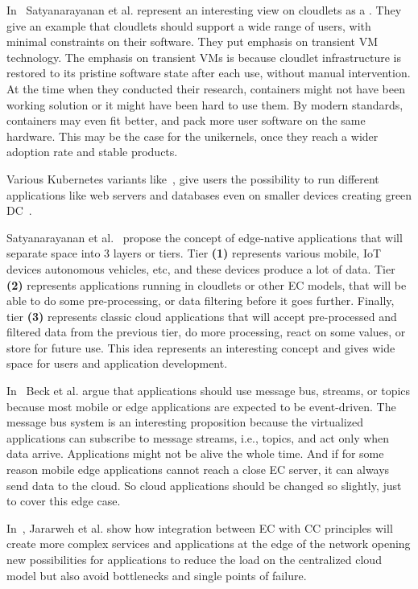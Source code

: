 In~\cite{SatyanarayananBCD09} Satyanarayanan et al. represent an interesting view on cloudlets as a . They give an example that cloudlets should support a wide range of users, with minimal constraints on their software. They put emphasis on transient VM technology. The emphasis on transient VMs is because cloudlet infrastructure is restored to its pristine software state after each use, without manual intervention. At the time when they conducted their research, containers might not have been working solution or it might have been hard to use them. By modern standards, containers may even fit better, and pack more user software on the same hardware. This may be the case for the unikernels, once they reach a wider adoption rate and stable products.

Various Kubernetes variants like~\cite{KubeEdge, RossiCPN20}, give users the possibility to run different applications like web servers and databases even on smaller devices creating green DC~\cite{ArocaG12}.

Satyanarayanan et al.~\cite{SatyanarayananK19} propose the concept of edge-native applications that will separate space into 3 layers or tiers. Tier \textbf{(1)} represents various mobile, IoT devices autonomous vehicles, etc, and these devices produce a lot of data. Tier \textbf{(2)} represents applications running in cloudlets or other EC models, that will be able to do some pre-processing, or data filtering before it goes further. Finally, tier \textbf{(3)} represents classic cloud applications that will accept pre-processed and filtered data from the previous tier, do more processing, react on some values, or store for future use. This idea represents an interesting concept and gives wide space for users and application development.

In~\cite{inproceedingsBeck} Beck et al. argue that applications should use message bus, streams, or topics because most mobile or edge applications are expected to be event-driven. The message bus system is an interesting proposition because the virtualized applications can subscribe to message streams, i.e., topics, and act only when data arrive. Applications might not be alive the whole time. And if for some reason mobile edge applications cannot reach a close EC server, it can always send data to the cloud. So cloud applications should be changed so slightly, just to cover this edge case.

In~\cite{JararwehDAAAB16}, Jararweh et al. show how integration between EC with CC principles will create more complex services and applications at the edge of the network opening new possibilities for applications to reduce the load on the centralized cloud model but also avoid bottlenecks and single points of failure.
%
%
